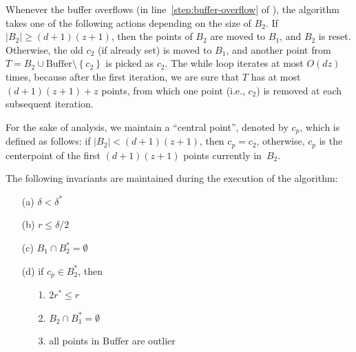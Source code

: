 \documentclass[envcountsame]{cls/cccg15}
\newcommand{\cp}{c_p}
\newcommand{\dz}{(d + 1)(z + 1)}
\newcommand{\Buffer}{\ensuremath{\text{Buffer}}}
\newcommand{\set}[1]{\left\{ #1 \right\}}
\newcommand{\card}[1]{\left|{#1}\right|}
\newcommand{\len}[1]{\|{#1}\|}
\newcommand{\radius}[1]{\frac{2}{\alpha} \len{c_1 #1}}
\newcommand{\lee}{\leqslant}
\newcommand{\gee}{\geqslant}
\renewcommand{\leq}{\lee}
\renewcommand{\le}{\lee}
\renewcommand{\ge}{\gee}
\begin{document}
Whenever the buffer overflows (in line~\ref{step:buffer-overflow} of ),
the algorithm takes one of the following actions
depending on the size of $B_2$. 
If $|B_2| \ge \dz$, then the points of $B_2$ are moved to $B_1$, and $B_2$ is reset.
Otherwise, the old $c_2$ (if already set) is moved to $B_1$,
and another point from $T = B_2 \cup \Buffer \setminus \set{c_2}$ is picked as $c_2$.
The while loop iterates at most $O(dz)$ times,
because after the first iteration, we are sure 
that $T$ has at most $\dz + z$ points, from which 
one point (i.e., $c_2$) is removed at each subsequent iteration.


For the sake of analysis, we maintain a ``central point'', 
denoted by $\cp$, %
which is defined as follows:
if $\card{B_2} < \dz$, then $\cp = c_2$, otherwise,
$\cp$ is the centerpoint of the first $\dz$ points currently in~$B_2$.

\begin{lemma}
\label{lem:invariants}
	The following invariants are maintained during the execution of the algorithm:

\begin{enumerate}
\item [(a)] $\delta < \delta^*$ %
\item [(b)] $r \leq \delta/2$
\item [(c)] $B_1 \cap B_2^* = \emptyset$
\item [(d)]  if $\cp \in B_2^*$, then 
	\begin{enumerate}
		\item [1.] $2r^* \le r$
		\item [2.] $B_2 \cap B_1^* = \emptyset$
		\item [3.] all points in $\Buffer$ are outlier
	\end{enumerate}

\end{enumerate}
\end{lemma}
\end{document}
